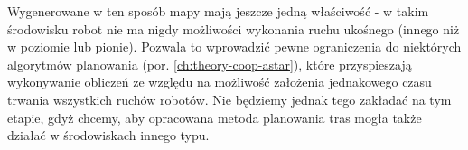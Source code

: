 Wygenerowane w ten sposób mapy mają jeszcze jedną właściwość - w takim środowisku robot nie ma nigdy możliwości wykonania ruchu ukośnego (innego niż w poziomie lub pionie). Pozwala to wprowadzić pewne ograniczenia do niektórych algorytmów planowania (por. \ref{ch:theory-coop-astar}), które przyspieszają wykonywanie obliczeń ze względu na możliwość założenia jednakowego czasu trwania wszystkich ruchów robotów. Nie będziemy jednak tego zakładać na tym etapie, gdyż chcemy, aby opracowana metoda planowania tras mogła także działać w środowiskach innego typu.

